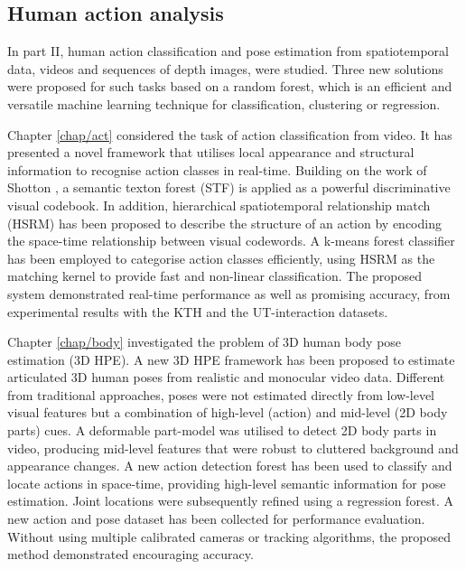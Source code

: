 \subsection{Human action analysis}

In part II, human action classification and pose estimation from spatiotemporal data, \eg videos and sequences of depth images, were studied. Three new solutions were proposed for such tasks based on a random forest, which is an efficient and versatile machine learning technique for classification, clustering or regression. 

Chapter \ref{chap/act} considered the task of action classification from video. It has presented a novel framework that utilises local appearance and structural information to recognise action classes in real-time. Building on the work of Shotton \etal \cite{Shotton2008}, a semantic texton forest (STF) is applied as a powerful discriminative visual codebook. In addition, hierarchical spatiotemporal relationship match (HSRM) has been proposed to describe the structure of an action by encoding the space-time relationship between visual codewords. A k-means forest classifier has been employed to categorise action classes efficiently, using HSRM as the matching kernel to provide fast and non-linear classification. The proposed system demonstrated real-time performance as well as promising accuracy, from experimental results with the KTH and the UT-interaction datasets. 

Chapter \ref{chap/body} investigated the problem of 3D human body pose estimation (3D HPE).
A new 3D HPE framework has been proposed to estimate articulated 3D human poses from realistic and monocular video data. Different from traditional approaches, poses were not estimated directly from low-level visual features but a combination of high-level (action) and mid-level (2D body parts) cues. 
A deformable part-model was utilised to detect 2D body parts in video, producing mid-level features that were robust to cluttered background and appearance changes. A new action detection forest has been used to classify and locate actions in space-time, providing high-level semantic information for pose estimation. Joint locations were subsequently refined using a regression forest. A new action and pose dataset has been collected for performance evaluation. Without using multiple calibrated cameras or tracking algorithms, the proposed method demonstrated encouraging accuracy.

